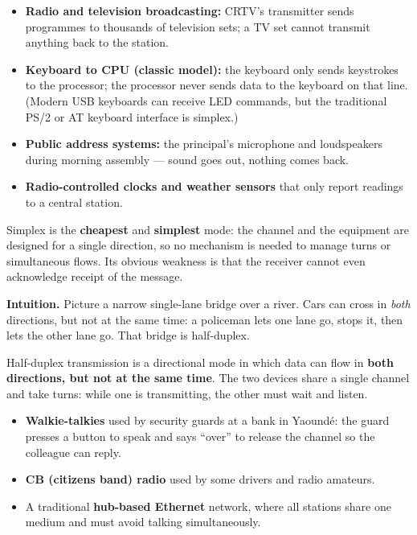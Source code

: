 \documentclass[11pt]{article}
\newcommand{\cle}[1]{{\popxbold\color{popdark}#1}}
\newcounter{popsec}
\newcounter{popsub}
\newcommand{\courssub}[1]{%
  \stepcounter{popsub}%
  \par\vspace{9pt}\noindent{\popxbold\fontsize{11.5}{13}\selectfont\color{popink}{\color{poporange}\thepopsec.\thepopsub}\hspace{6pt}#1}\par\nopagebreak\vspace{4pt}
}
\begin{document}
\begin{exemplebox}
\begin{itemize}
\item \textbf{Radio and television broadcasting:} CRTV's transmitter sends programmes to thousands of television sets; a TV set cannot transmit anything back to the station.
\item \textbf{Keyboard to CPU (classic model):} the keyboard only sends keystrokes to the processor; the processor never sends data to the keyboard on that line. (Modern USB keyboards can receive LED commands, but the traditional PS/2 or AT keyboard interface is simplex.)
\item \textbf{Public address systems:} the principal's microphone and loudspeakers during morning assembly --- sound goes out, nothing comes back.
\item \textbf{Radio-controlled clocks and weather sensors} that only report readings to a central station.
\end{itemize}
\end{exemplebox}

Simplex is the \textbf{cheapest} and \textbf{simplest} mode: the channel and the equipment are designed for a single direction, so no mechanism is needed to manage turns or simultaneous flows. Its obvious weakness is that the receiver cannot even acknowledge receipt of the message.

\courssub{Half-Duplex Transmission}

\textbf{Intuition.} Picture a narrow single-lane bridge over a river. Cars can cross in \emph{both} directions, but not at the same time: a policeman lets one lane go, stops it, then lets the other lane go. That bridge is half-duplex.

\begin{definition}
\cle{Half-duplex transmission} is a directional mode in which data can flow in \textbf{both directions, but not at the same time}. The two devices share a single channel and take turns: while one is transmitting, the other must wait and listen.
\end{definition}

\begin{exemplebox}
\begin{itemize}
\item \textbf{Walkie-talkies} used by security guards at a bank in Yaoundé: the guard presses a button to speak and says ``over'' to release the channel so the colleague can reply.
\item \textbf{CB (citizens band) radio} used by some drivers and radio amateurs.
\item A traditional \textbf{hub-based Ethernet} network, where all stations share one medium and must avoid talking simultaneously.
\end{itemize}
\end{exemplebox}
\end{document}
